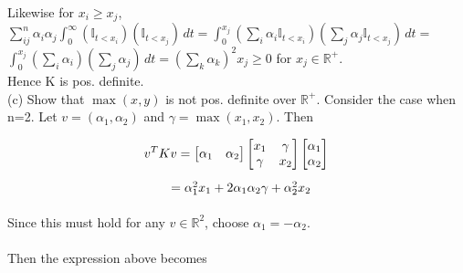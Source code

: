 \documentclass[18pt]{article}
\begin{document}
\begin{flushleft}
\vspace{.4cm}
Likewise for $ x_i \geq x_j$,\\
\vspace{.4cm}
$\sum_{ij}^n \alpha_i \alpha_j \int_{0}^{\infty} (\mathbb{I}_{t<x_i}) (\mathbb{I}_{t<x_j}) \,dt=\int_{0}^{x_j} (\sum_i \alpha_i \mathbb{I}_{t<x_i}) (\sum_j \alpha_j \mathbb{I}_{t<x_j}) \,dt=$\\
$\int_0^{x_j} (\sum_i \alpha_i)(\sum_j \alpha_j) \,dt=(\sum_k \alpha_k)^2 x_j \geq 0$ for $x_j \in \mathbb{R}^{+}$.\\
    \vspace{.4cm}
    Hence K is pos. definite.\\
    \vspace{.4cm}
    (c) Show that $\max(x,y)$ is not pos. definite over $\mathbb{R}^{+}$.
    \vspace{.4cm}
    Consider the case when n=2. Let $v=(\alpha_1,\alpha_2)$ and $\gamma=\max(x_1,x_2)$. Then\\
    \end{flushleft}
    $$ v^T K v=
    \begin{bmatrix} \alpha_1 & \alpha_2 \end{bmatrix}
        \begin{bmatrix} x_1 & \gamma\\
                        \gamma & x_2 \end{bmatrix}
    \begin{bmatrix} \alpha_1 \\ \alpha_2 \end{bmatrix}\\
    $$
    $\hspace{4.5cm} =\alpha_1^2 x_1 + 2 \alpha_1 \alpha_2 \gamma + \alpha_2^2 x_2$\\
    \vspace{.4cm}
    \\
    Since this must hold for any $v \in \mathbb{R}^2$, choose $\alpha_1=-\alpha_2$.\\
    \\
    Then the expression above becomes\\
\end{document}
